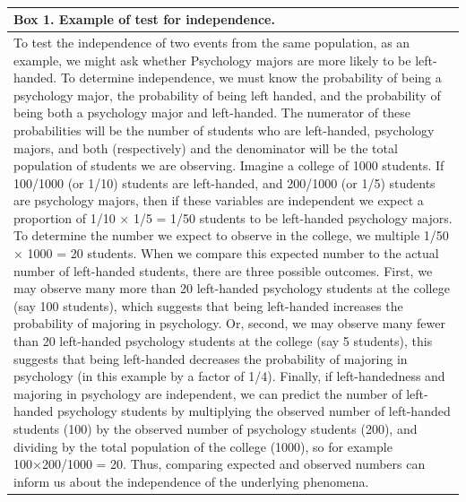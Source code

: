 \documentclass[
  english,
  ,man,floatsintext]{apa6}
\begin{document}
~

\begingroup\fontsize{10}{12}\selectfont

\begin{longtable}{>{\raggedright\arraybackslash}p{450px}}
\toprule
Box 1. Example of test for independence.\\
\midrule
To test the independence of two events from the same population, as an example, we might ask whether Psychology majors are more likely to be left-handed. To determine independence, we must know the probability of being a psychology major, the probability of being left handed, and the probability of being both a psychology major and left-handed. The numerator of these probabilities will be the number of students who are left-handed, psychology majors, and both (respectively) and the denominator will be the total population of students we are observing. Imagine a college of 1000 students. If 100/1000 (or 1/10) students are left-handed, and 200/1000 (or 1/5) students are psychology majors, then if these variables are independent we expect a proportion of 1/10 × 1/5 = 1/50 students to be left-handed psychology majors. To determine the number we expect to observe in the college, we multiple 1/50 × 1000 = 20 students. When we compare this expected number to the actual number of left-handed students, there are three possible outcomes. First, we may observe many more than 20 left-handed psychology students at the college (say 100 students), which suggests that being left-handed increases the probability of majoring in psychology. Or, second, we may observe many fewer than 20 left-handed psychology students at the college (say 5 students), this suggests that being left-handed decreases the probability of majoring in psychology (in this example by a factor of 1/4). Finally, if left-handedness and majoring in psychology are independent, we can predict the number of left-handed psychology students by multiplying the observed number of left-handed students (100) by the observed number of psychology students (200), and dividing by the total population of the college (1000), so for example 100×200/1000 = 20. Thus, comparing expected and observed numbers can inform us about the independence of the underlying phenomena.\\
\bottomrule
\end{longtable}
\endgroup{}
\end{document}
